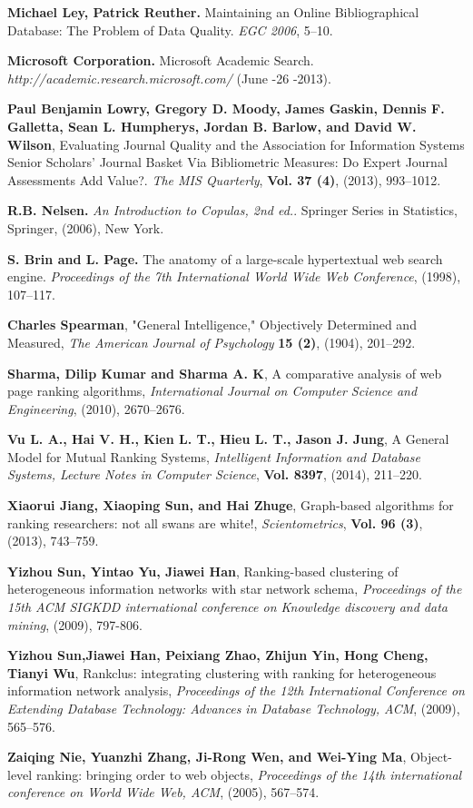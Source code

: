 \documentclass[10pt,leqno,twoside]{article}
\begin{document}
\begin{thebibliography}{99}
\textbf{Michael Ley, Patrick Reuther.}
Maintaining an Online Bibliographical Database: The Problem of Data Quality.
\textit{EGC 2006}, 5--10.

\textbf{Microsoft  Corporation.}
Microsoft Academic Search.
\textit{http://academic.research.microsoft.com/} (June -26 -2013).

\textbf{Paul Benjamin Lowry, Gregory D. Moody, James Gaskin, Dennis F. Galletta, Sean L. Humpherys, Jordan B. Barlow, and David W. Wilson},
Evaluating Journal Quality and the Association for Information Systems Senior Scholars' Journal Basket Via Bibliometric Measures: Do Expert Journal Assessments Add Value?.
\textit{The MIS Quarterly},
\textbf{Vol. 37 (4)}, (2013), 993--1012. 

%
\textbf{R.B. Nelsen.}
\textit{An Introduction to Copulas, 2nd ed.}.
Springer Series in Statistics, Springer, (2006), New York.


\textbf{S. Brin and L. Page.}
The anatomy of a large-scale hypertextual web search engine.
\textit{Proceedings of the 7th International World Wide Web Conference}, (1998), 107--117.

\textbf{Charles Spearman},
"General Intelligence," Objectively Determined and Measured,
\textit{The American Journal of Psychology}
\textbf{ 15 (2)}, (1904), 201--292.


\textbf{Sharma, Dilip Kumar and Sharma A. K},
A comparative analysis of web page ranking algorithms,
\textit{International Journal on Computer Science and Engineering}, (2010), 2670--2676.

\textbf{Vu L. A., Hai V. H., Kien L. T., Hieu L. T., Jason J. Jung},
A General Model for Mutual Ranking Systems,
\textit{Intelligent Information and Database Systems, Lecture Notes in Computer Science}, 
\textbf{Vol. 8397}, (2014), 211--220.

\textbf{Xiaorui Jiang, Xiaoping Sun, and Hai Zhuge}, Graph-based algorithms for ranking researchers: not all swans are white!,
\textit{Scientometrics},
\textbf{Vol. 96 (3)}, (2013), 743--759.

\textbf{Yizhou Sun, Yintao Yu, Jiawei Han},
Ranking-based clustering of heterogeneous information networks with star network schema,
\textit{Proceedings of the 15th ACM SIGKDD international conference on Knowledge discovery and data mining},
(2009), 797-806.

\textbf{Yizhou Sun,Jiawei Han, Peixiang Zhao, Zhijun Yin, Hong Cheng, Tianyi Wu},
Rankclus: integrating clustering with ranking for heterogeneous information network analysis,
\textit{Proceedings of the 12th International Conference on Extending Database Technology: Advances in Database Technology, ACM}, (2009), 565--576. 

\textbf{Zaiqing Nie, Yuanzhi Zhang, Ji-Rong Wen, and Wei-Ying Ma},
Object-level ranking: bringing order to web objects,
\textit{Proceedings of the 14th international conference on World Wide Web, ACM}, (2005), 567--574.


\end{thebibliography}
\end{document}
